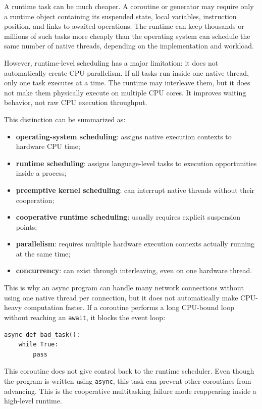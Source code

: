 A runtime task can be much cheaper. A coroutine or generator may require only a runtime object containing its suspended state, local variables, instruction position, and links to awaited operations. The runtime can keep thousands or millions of such tasks more cheaply than the operating system can schedule the same number of native threads, depending on the implementation and workload.

However, runtime-level scheduling has a major limitation: it does not automatically create CPU parallelism. If all tasks run inside one native thread, only one task executes at a time. The runtime may interleave them, but it does not make them physically execute on multiple CPU cores. It improves waiting behavior, not raw CPU execution throughput.

This distinction can be summarized as:

\begin{itemize}
    \item \textbf{operating-system scheduling}: assigns native execution contexts to hardware CPU time;
    \item \textbf{runtime scheduling}: assigns language-level tasks to execution opportunities inside a process;
    \item \textbf{preemptive kernel scheduling}: can interrupt native threads without their cooperation;
    \item \textbf{cooperative runtime scheduling}: usually requires explicit suspension points;
    \item \textbf{parallelism}: requires multiple hardware execution contexts actually running at the same time;
    \item \textbf{concurrency}: can exist through interleaving, even on one hardware thread.
\end{itemize}

This is why an async program can handle many network connections without using one native thread per connection, but it does not automatically make CPU-heavy computation faster. If a coroutine performs a long CPU-bound loop without reaching an \texttt{await}, it blocks the event loop:

\begin{verbatim}
async def bad_task():
    while True:
        pass
\end{verbatim}

This coroutine does not give control back to the runtime scheduler. Even though the program is written using \texttt{async}, this task can prevent other coroutines from advancing. This is the cooperative multitasking failure mode reappearing inside a high-level runtime.

